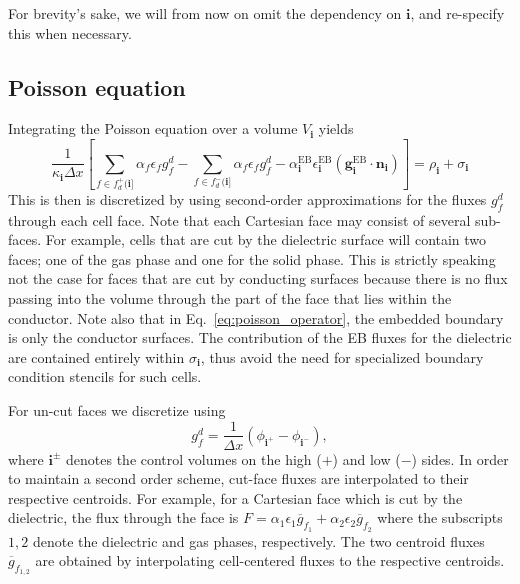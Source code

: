 \documentclass[3p]{elsarticle}
\begin{document}
For brevity's sake, we will from now on omit the dependency on $\bm{i}$, and re-specify this when necessary. 

\subsection{Poisson equation}
\label{sec:poisson}
Integrating the Poisson equation over a volume $V_{\bm{i}}$ yields 
\begin{equation}
  \label{eq:poisson_operator}
  \frac{1}{\kappa_{\bm{i}}\Delta x}\left[\sum_{f\in f_d^+(\bm{i]}}\alpha_f\epsilon_fg_f^d - \sum_{f\in f_d^-(\bm{i]}}\alpha_f\epsilon_fg_f^d - \alpha_{\bm{i}}^{\text{EB}}\epsilon_{\bm{i}}^{\text{EB}}\left(\bm{g}^{\text{EB}}_{\bm{i}}\cdot\bm{n}_{\bm{i}}\right)\right] = \rho_{\bm{i}} + \sigma_{\bm{i}}
\end{equation}
This is then is discretized by using second-order approximations for the fluxes $g_f^d$ through each cell face. Note that each Cartesian face may consist of several sub-faces. For example, cells that are cut by the dielectric surface will contain two faces; one of the gas phase and one for the solid phase. This is strictly speaking not the case for faces that are cut by conducting surfaces because there is no flux passing into the volume through the part of the face that lies within the conductor. Note also that in Eq.~\ref{eq:poisson_operator}, the embedded boundary is only the conductor surfaces. The contribution of the EB fluxes for the dielectric are contained entirely within $\sigma_{\bm{i}}$, thus avoid the need for specialized boundary condition stencils for such cells. 

For un-cut faces we discretize using
\begin{equation}
  g_f^d = \frac{1}{\Delta x}\left(\phi_{\bm{i}^+}-\phi_{\bm{i}^-}\right),
\end{equation}
where $\bm{i}^\pm$ denotes the control volumes on the high ($+$) and low ($-$) sides. In order to maintain a second order scheme, cut-face fluxes are interpolated to their respective centroids. For example, for a Cartesian face which is cut by the dielectric, the flux through the face is $F = \alpha_1\epsilon_1\overline{g}_{f_1} + \alpha_2\epsilon_2\overline{g}_{f_2}$ where the subscripts $1,2$ denote the dielectric and gas phases, respectively. The two centroid fluxes $\overline{g}_{f_{1,2}}$ are obtained by interpolating cell-centered fluxes to the respective centroids. 
\end{document}
